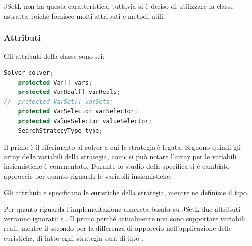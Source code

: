JSetL non ha questa caratteristica, tuttavia si è deciso di utilizzare la
classe astratta poiché fornisce molti attributi e metodi utili.

\subsubsection{Attributi}
Gli attributi della classe  sono sei:
\begin{lstlisting}[language = Java, frame = single]
	Solver solver;
	protected Var[] vars;
	protected VarReal[] varReals;
//	protected VarSet[] varSets;
	protected VarSelector varSelector;
	protected ValueSelector valueSelector;
	SearchStrategyType type;
\end{lstlisting}
Il primo è il riferimento al solver a cui la strategia è legata.
Seguono quindi gli array delle variabili della strategia, come si può notare
l'array per le variabili insiemistiche è commentato. Durante lo studio della 
specifica si è cambiato approccio
per quanto riguarda le variabili insiemistiche.

Gli attributi  e  specificano
le euristiche della strategia, mentre  ne definisce il tipo.

\begin{nota}
Per quanto riguarda l'implementazione concreta basata su JSetL due attributi 
verranno ignorati:  e . Il primo perché attualmente 
non sono supportate variabili reali, mentre il secondo per la differenza di 
apporccio nell'applicazione delle euristiche, di fatto ogni strategia sarà di 
tipo .
\end{nota}

